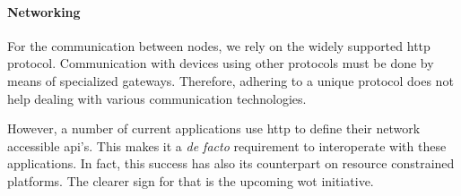 \paragraph{Networking}

For the communication between nodes, we rely on the widely supported \ac{http} protocol. %
Communication with devices using other protocols must be done by means of specialized gateways. %
Therefore, adhering to a unique protocol does not help dealing with various communication technologies.

However, a number of current applications use \ac{http} to define their network accessible \ac{api}'s. %
This makes it a \emph{de facto} requirement to interoperate with these applications. %
In fact, this success has also its counterpart on resource constrained platforms.
The clearer sign for that is the upcoming \ac{wot} initiative.


